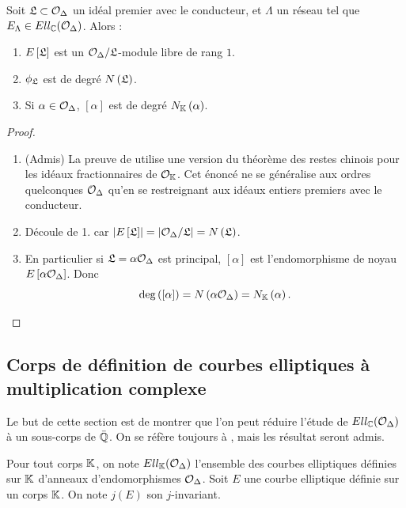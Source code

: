 \begin{Prop}
	Soit $\mathfrak{L}\subset\mathcal{O}_{\Delta}$ un idéal premier avec le conducteur, et $\Lambda$ un réseau tel que $E_{\Lambda}\in Ell_{\mathbb{C}}(\mathcal{O}_{\Delta})$. Alors :
	\begin{enumerate}
		\item $E\left[\mathfrak{L}\right]$ est un $\mathcal{O}_{\Delta}/\mathfrak{L}$-module libre de rang $1$.
		\item $\phi_{\mathfrak{L}}$ est de degré $N\left( \mathfrak{L}\right)$.
		\item Si $\alpha\in\mathcal{O}_{\Delta}$, $[\alpha]$ est de degré $N_{\mathbb{K}}\left( \alpha\right) $.
	\end{enumerate}
\end{Prop}
\begin{proof}
	\begin{enumerate}
		\item (Admis) La preuve de \cite{Sil94} utilise une version du théorème des restes chinois pour les idéaux fractionnaires de $\mathcal{O}_{\mathbb{K}}$. Cet énoncé ne se généralise aux ordres quelconques $\mathcal{O}_{\Delta}$ qu'en se restreignant aux idéaux entiers premiers avec le conducteur.  
		
		\item Découle de 1. car $\left| E\left[\mathfrak{L}\right]\right| = \left| \mathcal{O}_{\Delta}/\mathfrak{L}\right| = N\left( \mathfrak{L}\right)$.
		
		\item En particulier si $\mathfrak{L} = \alpha\mathcal{O}_{\Delta}$ est principal, $[\alpha]$ est l'endomorphisme de noyau $E\left[\alpha\mathcal{O}_{\Delta}\right]$. Donc 
		\begin{equation*}
			\deg \left( \left[\alpha \right] \right) = N\left( \alpha\mathcal{O}_{\Delta}\right) = N_{\mathbb{K}}\left( \alpha\right).
		\end{equation*}
	\end{enumerate}
\end{proof}


\subsection{Corps de définition de courbes elliptiques à multiplication complexe}\label{SectionCourbesSurHilbert}


Le but de cette section est de montrer que l'on peut réduire l'étude de $Ell_{\mathbb{C}}(\mathcal{O}_{\Delta})$ à un sous-corps de $\bar{\mathbb{Q}}$. On se réfère toujours à \cite{Sil94}, mais les résultat seront admis. 

\begin{Def}
	Pour tout corps $\mathbb{K}$, on note $Ell_{\mathbb{K}}(\mathcal{O}_{\Delta})$ l'ensemble des courbes elliptiques définies sur $\mathbb{K}$ d'anneaux d'endomorphismes $\mathcal{O}_{\Delta}$. Soit $E$ une courbe elliptique définie sur un corps $\mathbb{K}$. On note $j(E)$ son $j$-invariant. 
\end{Def}

